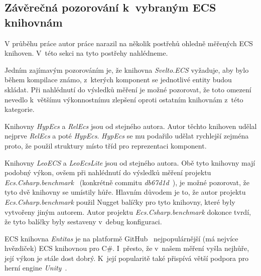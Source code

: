\subsection{Závěrečná pozorování k~vybraným ECS knihovnám}
V průběhu práce autor práce narazil na několik postřehů ohledně měřených ECS knihoven. V~této sekci na tyto postřehy nahlédneme.

Jedním zajímavým pozorováním je, že knihovna \textit{Svelto.ECS} vyžaduje, aby bylo během kompilace známo, z~kterých komponent se jednotlivé entity budou skládat. Při nahlédnutí do výsledků měření je možné pozorovat, že toto omezení nevedlo k~většímu výkonnostnímu zlepšení oproti ostatním knihovnám z~této kategorie.

Knihovny \textit{HypEcs} a \textit{RelEcs} jsou od stejného autora. Autor těchto knihoven udělal nejprve \textit{RelEcs} a poté \textit{HypEcs}. \textit{HypEcs} se mu podařilo udělat rychlejší zejména proto, že použil struktury místo tříd pro reprezentaci komponent.

Knihovny \textit{LeoECS} a \textit{LeoEcsLite} jsou od stejného autora. Obě tyto knihovny mají podobný výkon, ovšem při nahlédnutí do výsledků měření projektu \textit{Ecs.Csharp.benchmark}~\cite{EcsCsharpBenchmark} (konkrétně commitu \textit{db67d1d}~\cite{EcsCsharpBenchmarkCommit}), je možné pozorovat, že tyto dvě knihovny se umístily hůře. Hlavním důvodem je to, že autor projektu \textit{Ecs.Csharp.benchmark} použil Nugget balíčky pro tyto knihovny, které byly vytvořeny jiným autorem. Autor projektu \textit{Ecs.Csharp.benchmark} dokonce tvrdí, že tyto balíčky byly sestaveny v~debug konfiguraci.

ECS knihovna \textit{Entitas} je na platformě GitHub~\cite{GitHub} nejpopulárnější (má nejvíce hvězdiček) ECS knihovnou pro C\#. I~přesto, že v~našem měření vyšla nejhůře, její výkon je stále dost dobrý. K~její popularitě také přispívá větší podpora pro herní engine \textit{Unity}~\cite{Unity}.
